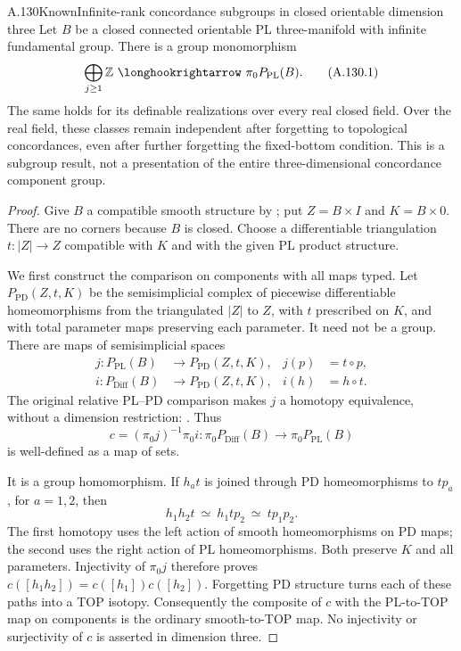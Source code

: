 \begin{saresult}{A.130}{Known}{Infinite-rank concordance subgroups in closed orientable dimension three}
Let $B$ be a closed connected orientable PL three-manifold with
infinite fundamental group. There is a group monomorphism
\[
 \bigoplus_{j\ge1}\mathbb Z\ \longhookrightarrow\
 \pi_0P_{\mathrm{PL}}(B).
                                                        \tag{A.130.1}
\]
The same holds for its definable realizations over every real
closed field. Over the real field, these classes remain independent
after forgetting to topological concordances, even after further
forgetting the fixed-bottom condition.
This is a subgroup result, not a presentation of the entire
three-dimensional concordance component group.
\end{saresult}
\begin{proof}
Give $B$ a compatible smooth structure by
\cite[Essay~I, p.~39]{KirbySiebenmann1977}; put $Z=B\times I$ and
$K=B\times0$. There are no corners because $B$ is closed.
Choose a differentiable triangulation
$t:|Z|\longrightarrow Z$ compatible with $K$ and with the given
PL product structure.

We first construct the comparison on components with all maps typed.
Let $P_{\mathrm{PD}}(Z,t,K)$ be the semisimplicial complex of
piecewise differentiable homeomorphisms from the triangulated
$|Z|$ to $Z$, with $t$ prescribed on $K$, and with total parameter
maps preserving each parameter. It need not be a group.
There are maps of semisimplicial spaces
\[
 \begin{split}
 j:P_{\mathrm{PL}}(B)&\longrightarrow P_{\mathrm{PD}}(Z,t,K),
       &j(p)&=t\circ p,\\
 i:P_{\mathrm{Diff}}(B)&\longrightarrow P_{\mathrm{PD}}(Z,t,K),
       &i(h)&=h\circ t.
 \end{split}
                                                        \tag{A.130.2}
\]
The original relative PL--PD comparison makes $j$ a homotopy
equivalence, without a dimension restriction:
\cite[definitions and comparison, pp.~1--2; Theorem~1.1(c), p.~8]{BurgheleaLashof1974I}.
Thus
\[
 c=(\pi_0j)^{-1}\pi_0i:
 \pi_0P_{\mathrm{Diff}}(B)\longrightarrow
 \pi_0P_{\mathrm{PL}}(B)
                                                        \tag{A.130.3}
\]
is well-defined as a map of sets.

It is a group homomorphism. If $h_at$ is joined through PD
homeomorphisms to $tp_a$, for $a=1,2$, then
\[
 h_1h_2t\ \simeq\ h_1tp_2\ \simeq\ tp_1p_2.
\]
The first homotopy uses the left action of smooth homeomorphisms
on PD maps; the second uses the right action of PL homeomorphisms.
Both preserve $K$ and all parameters. Injectivity of $\pi_0j$
therefore proves $c([h_1h_2])=c([h_1])c([h_2])$.
Forgetting PD structure turns each of these paths into a TOP
isotopy. Consequently the composite of $c$ with the PL-to-TOP
map on components is the ordinary smooth-to-TOP map.
No injectivity or surjectivity of $c$ is asserted in dimension three.


\end{proof}
